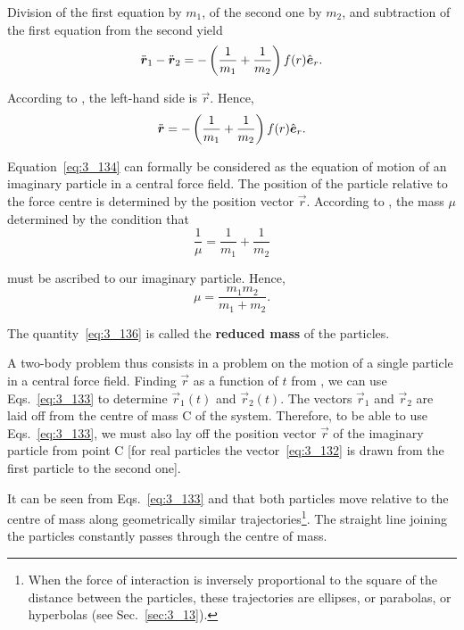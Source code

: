 \noindent
Division of the first equation by $m_1$, of the second one by $m_2$, and subtraction of the first equation from the second yield
\begin{equation*}
\ddot{\boldsymbol{r}}_1 - \ddot{\boldsymbol{r}}_2 = -\left(\frac{1}{m_1}+\frac{1}{m_2}\right)f(r)\hat{\boldsymbol{e}}_{r}.
\end{equation*}

\noindent
According to , the left-hand side is $\vec{r}$. Hence,
\begin{equation}\label{eq:3_134}
\ddot{\boldsymbol{r}} = -\left(\frac{1}{m_1}+\frac{1}{m_2}\right)f(r)\hat{\boldsymbol{e}}_{r}.
\end{equation}

\noindent
Equation~\eqref{eq:3_134} can formally be considered as the equation of motion of an imaginary particle in a central force field. The position of the particle relative to the force centre is determined by the position vector $\vec{r}$. According to , the mass $\mu$ determined by the condition that
\begin{equation}\label{eq:3_135}
\frac{1}{\mu} = \frac{1}{m_1} + \frac{1}{m_2}
\end{equation}

\noindent
must be ascribed to our imaginary particle. Hence,
\begin{equation}\label{eq:3_136}
\mu = \frac{m_1m_2}{m_1+m_2}.
\end{equation}

\noindent
The quantity~\eqref{eq:3_136} is called the \textbf{reduced mass} of the particles.

A two-body problem thus consists in a problem on the motion of a single particle in a central force field. Finding $\vec{r}$ as a function of $t$ from , we can use Eqs.~\eqref{eq:3_133} to determine $\vec{r}_1(t)$ and $\vec{r}_2(t)$. The vectors $\vec{r}_1$ and $\vec{r}_2$ are laid off from the centre of mass C of the system. Therefore, to be able to use Eqs.~\eqref{eq:3_133}, we must also lay off the position vector $\vec{r}$ of the imaginary particle from point C [for real particles the vector~\eqref{eq:3_132} is drawn from the first particle to the second one].

It can be seen from Eqs.~\eqref{eq:3_133} and  that both particles move relative to the centre of mass along geometrically similar trajectories\footnote{When the force of interaction is inversely proportional to the square of the distance between the particles, these trajectories are ellipses, or parabolas, or hyperbolas (see Sec.~\ref{sec:3_13}).}. The straight line joining the particles constantly passes through the centre of mass.

